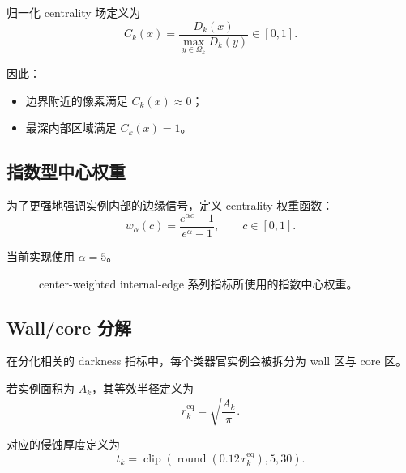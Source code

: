 \documentclass[11pt]{article}
\newcommand{\1}{\mathbf{1}}
\newcommand{\clip}{\operatorname{clip}}
\begin{document}
归一化 centrality 场定义为
\begin{equation}
C_k(x) = \frac{D_k(x)}{\max_{y\in\Omega_k} D_k(y)} \in [0,1].
\end{equation}

因此：
\begin{itemize}[leftmargin=1.5em]
  \item 边界附近的像素满足 $C_k(x)\approx 0$；
  \item 最深内部区域满足 $C_k(x)=1$。
\end{itemize}

\subsection{指数型中心权重}
为了更强地强调实例内部的边缘信号，定义 centrality 权重函数：
\begin{equation}
w_{\alpha}(c)=\frac{e^{\alpha c}-1}{e^{\alpha}-1}, \qquad c\in[0,1].
\end{equation}

当前实现使用 $\alpha=5$。

\begin{figure}[H]
\centering
{}
\caption{center-weighted internal-edge 系列指标所使用的指数中心权重。}
\end{figure}

\subsection{Wall/core 分解}
在分化相关的 darkness 指标中，每个类器官实例会被拆分为 wall 区与 core 区。

若实例面积为 $A_k$，其等效半径定义为
\begin{equation}
r_k^{\mathrm{eq}} = \sqrt{\frac{A_k}{\pi}}.
\end{equation}

对应的侵蚀厚度定义为
\begin{equation}
t_k = \clip\left(\operatorname{round}(0.12\,r_k^{\mathrm{eq}}), 5, 30\right).
\end{equation}
\end{document}
